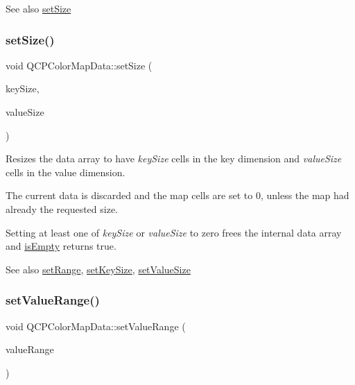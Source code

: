\begin{DoxySeeAlso}{See also}
\hyperlink{classQCPColorMapData_a0d9ff35c299d0478b682bfbcdd9c097e}{set\+Size} 
\end{DoxySeeAlso}
\mbox{\label{classQCPColorMapData_a0d9ff35c299d0478b682bfbcdd9c097e}} 
\subsubsection{\texorpdfstring{set\+Size()}{setSize()}}
{\footnotesize\ttfamily void Q\+C\+P\+Color\+Map\+Data\+::set\+Size (\begin{DoxyParamCaption}\item[{int}]{key\+Size,  }\item[{int}]{value\+Size }\end{DoxyParamCaption})}

Resizes the data array to have {\itshape key\+Size} cells in the key dimension and {\itshape value\+Size} cells in the value dimension.

The current data is discarded and the map cells are set to 0, unless the map had already the requested size.

Setting at least one of {\itshape key\+Size} or {\itshape value\+Size} to zero frees the internal data array and \hyperlink{classQCPColorMapData_aea88cc75a76ca571acf29b2ba8ac970d}{is\+Empty} returns true.

\begin{DoxySeeAlso}{See also}
\hyperlink{classQCPColorMapData_aad9c1c7c703c1339489fc730517c83d4}{set\+Range}, \hyperlink{classQCPColorMapData_ac7ef70e383aface34b44dbde49234b6b}{set\+Key\+Size}, \hyperlink{classQCPColorMapData_a0893c9e3914513048b45e3429ffd16f2}{set\+Value\+Size} 
\end{DoxySeeAlso}
\mbox{\label{classQCPColorMapData_ada1b2680ba96a5f4175b6d341cf75d23}} 
\subsubsection{\texorpdfstring{set\+Value\+Range()}{setValueRange()}}
{\footnotesize\ttfamily void Q\+C\+P\+Color\+Map\+Data\+::set\+Value\+Range (\begin{DoxyParamCaption}\item[{const \hyperlink{classQCPRange}{Q\+C\+P\+Range} \&}]{value\+Range }\end{DoxyParamCaption})}

